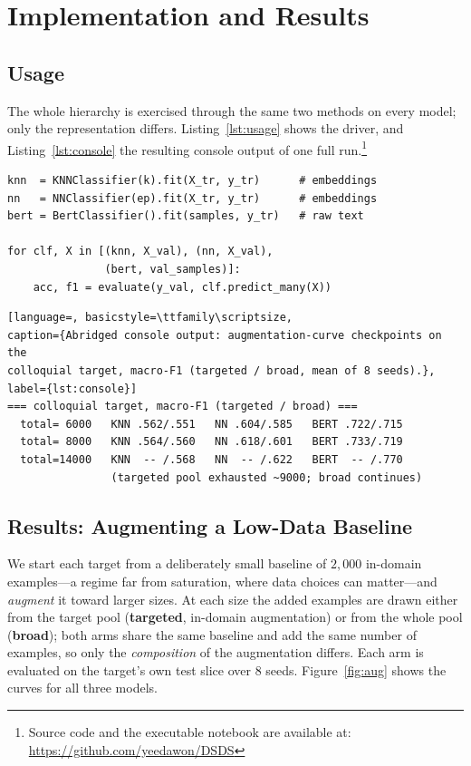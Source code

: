 \documentclass[conference]{IEEEtran}
\begin{document}
\section{Implementation and Results}
\label{sec:results}

\subsection{Usage}
The whole hierarchy is exercised through the same two methods on every
model; only the representation differs. Listing~\ref{lst:usage} shows the
driver, and Listing~\ref{lst:console} the resulting console output of one
full run.\footnote{Source code and the executable notebook are available
at: \url{https://github.com/yeedawon/DSDS}}

\begin{lstlisting}[caption={Driving the three classifiers through one
uniform interface (\texttt{fit}/\texttt{predict\_many}).}, label={lst:usage}]
knn  = KNNClassifier(k).fit(X_tr, y_tr)      # embeddings
nn   = NNClassifier(ep).fit(X_tr, y_tr)      # embeddings
bert = BertClassifier().fit(samples, y_tr)   # raw text

for clf, X in [(knn, X_val), (nn, X_val),
               (bert, val_samples)]:
    acc, f1 = evaluate(y_val, clf.predict_many(X))
\end{lstlisting}

\begin{lstlisting}[language=, basicstyle=\ttfamily\scriptsize,
caption={Abridged console output: augmentation-curve checkpoints on the
colloquial target, macro-F1 (targeted / broad, mean of 8 seeds).},
label={lst:console}]
=== colloquial target, macro-F1 (targeted / broad) ===
  total= 6000   KNN .562/.551   NN .604/.585   BERT .722/.715
  total= 8000   KNN .564/.560   NN .618/.601   BERT .733/.719
  total=14000   KNN  -- /.568   NN  -- /.622   BERT  -- /.770
                (targeted pool exhausted ~9000; broad continues)
\end{lstlisting}

\subsection{Results: Augmenting a Low-Data Baseline}
\label{sec:pertarget}
We start each target from a deliberately small baseline of $2{,}000$
in-domain examples---a regime far from saturation, where data choices can
matter---and \emph{augment} it toward larger sizes. At each size the added
examples are drawn either from the target pool (\textbf{targeted},
in-domain augmentation) or from the whole pool (\textbf{broad}); both arms
share the same baseline and add the same number of examples, so only the
\emph{composition} of the augmentation differs. Each arm is evaluated on
the target's own test slice over $8$ seeds. Figure~\ref{fig:aug} shows the
curves for all three models.
\end{document}
